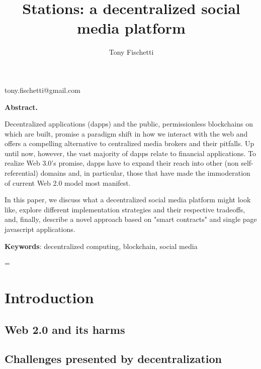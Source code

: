 \documentclass[10pt]{article}
\title{\renewcommand{\baselinestretch}{1.15}
Stations: a decentralized social media platform
}
\author{%
Tony Fischetti
}
\begin{document}
\date{}

\maketitle

\vspace{-1.2cm}

\begin{center}
{\footnotesize
tony.fischetti@gmail.com
}
\end{center}

\bigskip
\noindent
{\small{\bf Abstract.}

Decentralized applications (dapps) and the public, permissionless blockchains
on which are built, promise a paradigm shift in how we interact with the web
and offers a compelling alternative to centralized media brokers and their
pitfalls.
Up until now, however, the vast majority of dapps relate to financial
applications. To realize Web 3.0's promise, dapps have to expand their reach
into other (non self-referential) domains and, in particular, those that
have made the immoderation of current Web 2.0 model most manifest.

In this paper, we discuss what a decentralized social media platform might
look like, explore different implementation strategies and their respective
tradeoffs, and, finally, describe a novel approach based on "smart contracts"
and single page javascript applications.

}

\medskip
\noindent
{\small{\bf Keywords}{:}
decentralized computing, blockchain, social media
}

\baselineskip=\normalbaselineskip

\section{Introduction}\label{sec:1}

\subsection{Web 2.0 and its harms}

\subsection{Challenges presented by decentralization}
\end{document}
